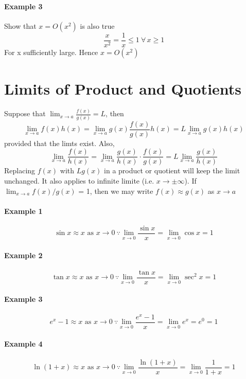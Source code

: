 \documentclass[12pt]{article}
\begin{document}
\paragraph{Example 3} Show that $x = O(x^2)$ is also true
\[
    \frac{x}{x^2} = \frac{1}{x} \leq 1 \: \forall \, x \geq 1 
\]
For x sufficiently large. Hence $x = O(x^2)$

\section{Limits of Product and Quotients}
Suppose that $\lim_{x \to a} \frac{f(x)}{g(x)} = L$, then 
\[
    \lim_{x \to a} f(x)h(x) = \lim_{x \to a} g(x)\frac{f(x)}{g(x)} h(x) = L \lim_{x \to a} g(x) h(x)
\]
provided that the limts exist.
Also,
\[
  \lim_{x \to a} \frac{f(x)}{h(x)} = \lim_{x \to a} \frac{g(x)}{h(x)} \cdot \frac{f(x)}{g(x)} = L\lim_{x \to a} \frac{g(x)}{h(x)}      
\]
Replacing $f(x)$ with $L g(x)$ in a product or quotient will keep the limit unchanged. It also applies to infinite limite (i.e. $x \to \pm \infty$).
If $\lim_{x \to a} f(x)/g(x)$ = 1, then we may write $f(x) \approx g(x)$ as $x \to a$

\paragraph{Example 1}
\[
    \sin x \approx x \textrm{ as } x \to 0 \: \because \lim_{x \to 0} \frac{\sin x}{x} = \lim_{x \to 0} \cos x = 1 
\]

\paragraph{Example 2}
\[
    \tan x \approx x \textrm{ as } x \to 0 \: \because \lim_{x \to 0} \frac{\tan x}{x} = \lim_{x \to 0} \sec^2 x = 1 
\]

\paragraph{Example 3}
\[
    e^x - 1 \approx x \textrm{ as } x \to 0 \: \because \lim_{x \to 0} \frac{e^x - 1}{x} = \lim_{x \to 0} e^x = e^0 = 1 
\]

\paragraph{Example 4}
\[
    \ln(1 + x) \approx x \textrm{ as } x \to 0 \: \because \lim_{x \to 0} \frac{\ln(1 + x)}{x} = \lim_{x \to 0} \frac{1}{1 + x} = 1 
\]
\end{document}
